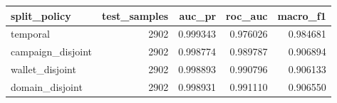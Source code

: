 \begin{tabular}{lrrrr}
\toprule
split_policy & test_samples & auc_pr & roc_auc & macro_f1 \\
\midrule
temporal & 2902 & 0.999343 & 0.976026 & 0.984681 \\
campaign_disjoint & 2902 & 0.998774 & 0.989787 & 0.906894 \\
wallet_disjoint & 2902 & 0.998893 & 0.990796 & 0.906133 \\
domain_disjoint & 2902 & 0.998931 & 0.991110 & 0.906550 \\
\bottomrule
\end{tabular}

